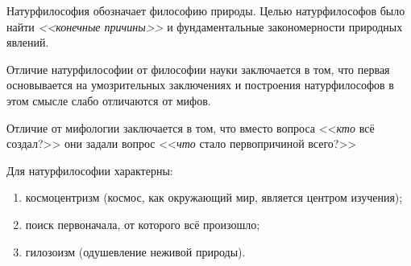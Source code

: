 
Натурфилософия обозначает философию природы. Целью натурфилософов было найти \textit{<<конечные причины>>} и фундаментальные закономерности природных явлений. 

Отличие натурфилософии от философии науки заключается в том, что первая основывается на умозрительных заключениях и построения натурфилософов в этом смысле слабо отличаются от мифов.

Отличие от мифологии заключается в том, что вместо вопроса <<\textit{кто} всё создал?>> они задали вопрос <<\textit{что} стало первопричиной всего?>> 

Для натурфилософии характерны:
\begin{enumerate}
	\itemsep-1ex
	\item космоцентризм (космос, как окружающий мир, является центром изучения);
	\item поиск первоначала, от которого всё произошло;
	\item гилозоизм (одушевление неживой природы).
\end{enumerate}

